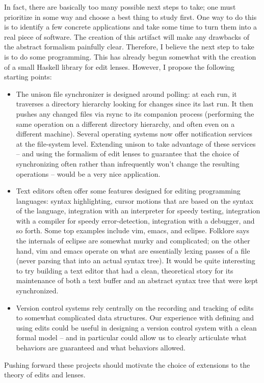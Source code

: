 \documentclass{article}
\begin{document}
In fact, there are basically too many possible next steps to take; one must
prioritize in some way and choose a best thing to study first. One way to do
this is to identify a few concrete applications and take some time to turn
them into a real piece of software. The creation of this artifact will make
any drawbacks of the abstract formalism painfully clear. Therefore, I
believe the next step to take is to do some programming. This has already
begun somewhat with the creation of a small Haskell library for edit lenses.
However, I propose the following starting points:

\begin{itemize}
    \item The unison file synchronizer is designed around polling: at each
        run, it traverses a directory hierarchy looking for changes since
        its last run. It then pushes any changed files via rsync to its
        companion process (performing the same operation on a different
        directory hierarchy, and often even on a different machine). Several
        operating systems now offer notification services at the file-system
        level. Extending unison to take advantage of these services -- and
        using the formalism of edit lenses to guarantee that the choice of
        synchronizing often rather than infrequently won't change the
        resulting operations -- would be a very nice application.
    \item Text editors often offer some features designed for editing
        programming languages: syntax highlighting, cursor motions that are
        based on the syntax of the language, integration with an interpreter
        for speedy testing, integration with a compiler for speedy
        error-detection, integration with a debugger, and so forth. Some top
        examples include vim, emacs, and eclipse. Folklore says the
        internals of eclipse are somewhat murky and complicated; on the
        other hand, vim and emacs operate on what are essentially lexing
        passes of a file (never parsing that into an actual syntax tree).
        It would be quite interesting to try building a text editor that had
        a clean, theoretical story for its maintenance of both a text buffer
        and an abstract syntax tree that were kept synchronized.
    \item Version control systems rely centrally on the recording and
        tracking of edits to somewhat complicated data structures. Our
        experience with defining and using edits could be useful in
        designing a version control system with a clean formal model -- and
        in particular could allow us to clearly articulate what behaviors
        are guaranteed and what behaviors allowed.
\end{itemize}

Pushing forward these projects should motivate the choice of extensions to
the theory of edits and lenses.
\end{document}
